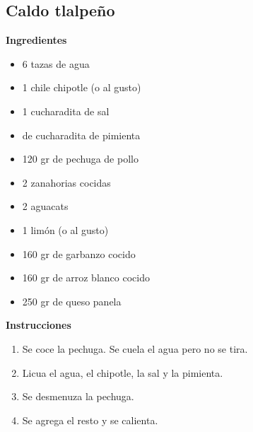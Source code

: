 \subsection{Caldo tlalpeño}
\textbf{Ingredientes}
\begin{itemize}
\item 6 tazas de agua
\item 1 chile chipotle (o al gusto)
\item 1 cucharadita de sal
\item {} de cucharadita de pimienta
\item 120 gr de pechuga de pollo
\item 2 zanahorias cocidas
\item 2 aguacats
\item 1 lim\'on (o al gusto)
\item 160 gr de garbanzo cocido
\item 160 gr de arroz blanco cocido
\item 250 gr de queso panela
\end{itemize}

\textbf{Instrucciones}
\begin{enumerate}
\item Se coce la pechuga. Se cuela el agua pero no se tira.
\item Licua el agua, el chipotle, la sal y la pimienta.
\item Se desmenuza la pechuga.
\item Se agrega el resto y se calienta.
\end{enumerate}
